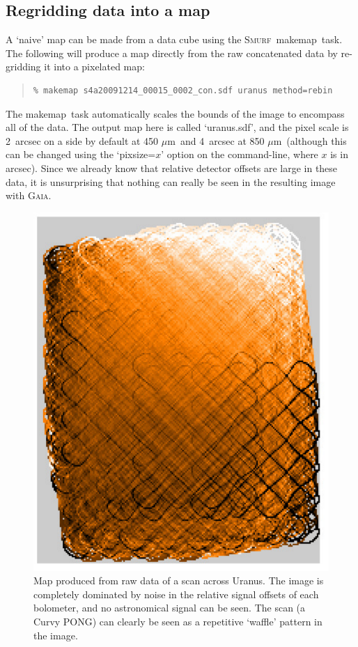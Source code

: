 \documentclass[twoside,11pt]{article}
\newcommand{\micron}{\mbox{\,${\mu}$m}}            %
\newcommand{\xref}[3]{#1}
\newcommand{\xlabel}[1]{}
\renewcommand{\_}{\texttt{\symbol{95}}}
\newenvironment{myquote}{\begin{quote}\begin{small}}{\end{small}\end{quote}}
\newcommand{\gaia}{\xref{\textsc{Gaia}}{sun214}{}}
\newcommand{\smurf}{\xref{\textsc{Smurf}}{sun258}{}}
\newcommand{\task}[1]{\textsf{#1}}
\newcommand{\makemap}{\xref{\task{makemap}}{sun258}{MAKEMAP}}
\begin{document}
\subsection{\xlabel{regrid_map}Regridding data into a map}

A `naive' map can be made from a data cube using the \smurf\ \makemap\
task. The following will produce a map directly from the raw
concatenated data by re-gridding it into a pixelated map:

\begin{myquote}
\begin{verbatim}
% makemap s4a20091214_00015_0002_con.sdf uranus method=rebin
\end{verbatim}
\end{myquote}

The \makemap\ task automatically scales the bounds of the image to
encompass all of the data. The output map here is called `uranus.sdf',
and the pixel scale is 2~arcsec on a side by default at 450\,\micron\
and 4~arcsec at 850\,\micron\ (although this can be changed using the
`pixsize=$x$' option on the command-line, where $x$ is in
arcsec). Since we already know that relative detector offsets are
large in these data, it is unsurprising that nothing can really be
seen in the resulting image with \gaia.

\begin{figure}
\begin{center}
\includegraphics[width=0.5\linewidth]{sc19_rawmap}
\caption{Map produced from raw data of a scan across Uranus. The
  image is completely dominated by noise in the relative signal
  offsets of each bolometer, and no astronomical signal can be
  seen. The scan (a Curvy PONG) can clearly be seen as a repetitive
  `waffle' pattern in the image.}
\label{fig:rawmap}
\end{center}
\end{figure}
\end{document}
